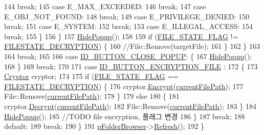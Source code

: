 \begin{DoxyCode}
144                     \textcolor{keywordflow}{break};
145             \textcolor{keywordflow}{case} E\_MAX\_EXCEEDED:
146                     \textcolor{keywordflow}{break};
147             \textcolor{keywordflow}{case} E\_OBJ\_NOT\_FOUND:
148                     \textcolor{keywordflow}{break};
149             \textcolor{keywordflow}{case} E\_PRIVILEGE\_DENIED:
150                     \textcolor{keywordflow}{break};
151             \textcolor{keywordflow}{case} E\_SYSTEM:
152                     \textcolor{keywordflow}{break};
153             \textcolor{keywordflow}{case} E\_ILLEGAL\_ACCESS:
154                     \textcolor{keywordflow}{break};
155             \}
156         \}
157         \hyperlink{class_list_view_item_popup_a5ae90134642d7aea3ae0b5389ea144a8}{HidePopup}();
158 
159         \textcolor{keywordflow}{if} (\hyperlink{_list_view_item_popup_8cpp_a514e8b025bf71e7b0500f6f8efb635ce}{FILE\_STATE\_FLAG} != \hyperlink{class_list_view_item_popup_a8f4af33ad25eb4228734b49c521d052c}{FILESTATE\_DECRYPTION}) \{
160             \textcolor{comment}{//File::Remove(targetFile);}
161         \}
162     \}
163 
164         \textcolor{keywordflow}{break};
165 
166     \textcolor{keywordflow}{case} \hyperlink{class_list_view_item_popup_a5a64693bdce3cd6333f7973aa69f54f9}{ID\_BUTTON\_CLOSE\_POPUP}: \{
167         \hyperlink{class_list_view_item_popup_a5ae90134642d7aea3ae0b5389ea144a8}{HidePopup}();
168     \}
169         \textcolor{keywordflow}{break};
170 
171     \textcolor{keywordflow}{case} \hyperlink{class_list_view_item_popup_a61acb07d5c6a128502350c9a309eb171}{ID\_BUTTON\_ENCRYPTION\_FILE} :
172     \{
173         \hyperlink{class_cryptor}{Cryptor} cryptor;
174 
175         \textcolor{keywordflow}{if} (\hyperlink{_list_view_item_popup_8cpp_a514e8b025bf71e7b0500f6f8efb635ce}{FILE\_STATE\_FLAG} == \hyperlink{class_list_view_item_popup_a8f4af33ad25eb4228734b49c521d052c}{FILESTATE\_DECRYPTION}) \{
176             cryptor.\hyperlink{class_cryptor_adfd6b30e2859df0dc7136ae3d90ddb31}{Encrypt}(\hyperlink{class_list_view_item_popup_a395472f1d8380e5d2d9e18e80a90c3a7}{currentFilePath});
177             File::Remove(\hyperlink{class_list_view_item_popup_a395472f1d8380e5d2d9e18e80a90c3a7}{currentFilePath});
178         \}
179         \textcolor{keywordflow}{else}
180         \{
181             cryptor.\hyperlink{class_cryptor_a82e76152a3351f63ae517664187d5498}{Decrypt}(\hyperlink{class_list_view_item_popup_a395472f1d8380e5d2d9e18e80a90c3a7}{currentFilePath});
182             File::Remove(\hyperlink{class_list_view_item_popup_a395472f1d8380e5d2d9e18e80a90c3a7}{currentFilePath});
183         \}
184         \hyperlink{class_list_view_item_popup_a5ae90134642d7aea3ae0b5389ea144a8}{HidePopup}();
185         \textcolor{comment}{//TODO file encryption, 플래그 변경}
186     \}
187         \textcolor{keywordflow}{break};
188     \textcolor{keywordflow}{default}:
189         \textcolor{keywordflow}{break};
190     \}
191     \hyperlink{class_list_view_item_popup_a33b5bebeb60329746d785d2b721748b0}{pFolderBrowser}->\hyperlink{class_folder_browser_a04d5bb9d0275ab67d6cc3b8d268b1b12}{Refresh}();
192 \}
\end{DoxyCode}


